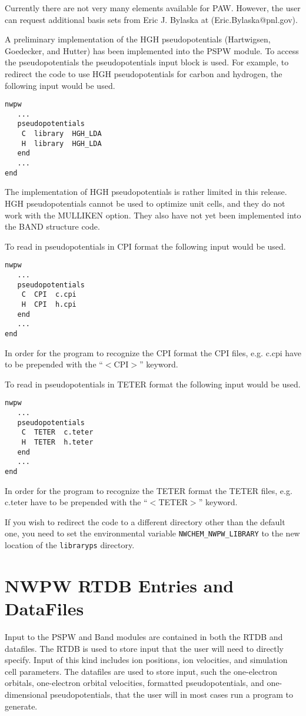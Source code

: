 Currently there are not very many elements available for PAW.  However,
the user can request additional basis sets from Eric J. Bylaska at (Eric.Bylaska@pnl.gov).

A preliminary implementation of the HGH pseudopotentials (Hartwigsen, Goedecker, and Hutter)
has been implemented into the PSPW module.  To access
the pseudopotentials the pseudopotentials input block is used.  For
example, to redirect the code to use HGH pseudopotentials for carbon
and hydrogen, the following input would be used.
\begin{verbatim}
nwpw
   ...
   pseudopotentials
    C  library  HGH_LDA
    H  library  HGH_LDA
   end
   ...
end
\end{verbatim}
The implementation of HGH pseudopotentials is rather limited in this release.
HGH pseudopotentials cannot be used to optimize unit cells, and they
do not work with the MULLIKEN option.  They also have not yet been implemented 
into the BAND structure code.

To read in pseudopotentials in CPI format the following input would be used.
\begin{verbatim}
nwpw
   ...
   pseudopotentials
    C  CPI  c.cpi
    H  CPI  h.cpi
   end
   ...
end
\end{verbatim}
In order for the program to recognize the CPI format the CPI files, e.g. c.cpi 
have to be prepended with the ``$<$CPI$>$'' keyword.

To read in pseudopotentials in TETER format the following input would be used.
\begin{verbatim}
nwpw
   ...
   pseudopotentials
    C  TETER  c.teter
    H  TETER  h.teter
   end
   ...
end
\end{verbatim}
In order for the program to recognize the TETER format the TETER files, e.g. c.teter 
have to be prepended with the ``$<$TETER$>$'' keyword.


If you wish to redirect the code to a different directory other than
the default one, 
you need to set the environmental variable
{\tt NWCHEM\_NWPW\_LIBRARY}
to the new location of the \verb+libraryps+ directory.



\section{NWPW RTDB Entries and DataFiles}
\label{sec:pspw_data}
Input to the PSPW and Band modules are contained in both the RTDB and datafiles.
The RTDB is used to store input that the user will need to directly specify.
Input of this kind includes ion positions, ion velocities, and simulation cell
parameters.  The datafiles are used to store input, such the one-electron 
orbitals, one-electron orbital velocities, formatted pseudopotentials, 
and one-dimensional pseudopotentials, that the user will in most cases
run a program to generate.

